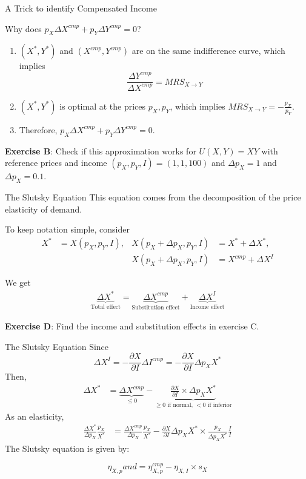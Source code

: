 \documentclass[handout]{beamer}
\newcommand{\cp}{{cmp}}
\begin{document}
\begin{frame}{A Trick to identify Compensated Income}

Why does $p_X\Delta X^{\cp} + p_Y \Delta Y^{\cp} = 0$?

\begin{enumerate}
\item $(X^*,Y^*)$ and $(X^\cp,Y^\cp)$ are on the same indifference curve, which implies $$\frac{\Delta Y^\cp}{\Delta X^\cp} = MRS_{X\to Y} $$
\item $(X^*,Y^*)$ is optimal at the prices $p_X, p_Y$, which implies $MRS_{X\to Y} = -\frac{p_X}{p_Y}$.
\item Therefore, $p_X \Delta X^\cp + p_Y \Delta Y^\cp = 0 $.
\end{enumerate}

\textbf{Exercise B}: Check if this approximation works for $U(X,Y) = XY$ with reference prices and income $(p_X,p_Y,I) = (1,1,100)$ and $\Delta p_X = 1$ and $\Delta p_X = 0.1$.
\end{frame}

\begin{frame}{The Slutsky Equation}
This equation comes from the decomposition of the price elasticity of demand.\medskip

To keep notation simple, consider 
\begin{align*}
 X^* &= X(p_X,p_Y,I), &     X(p_X + \Delta p_X, p_Y,I) &= X^* + \Delta X^*,\\ && X(p_X + \Delta p_X, p_Y,I) &= X^\cp +\Delta X^I
\end{align*}

We get
\begin{align*}
\underbrace{\Delta X^*}_{\text{Total effect}} = \underbrace{\Delta X^\cp}_{\text{Substitution effect}} + \underbrace{\Delta X^I}_{\text{Income effect}}
\end{align*}

\textbf{Exercise D}: Find the income and substitution effects in exercise C.
\end{frame}


\begin{frame}{The Slutsky Equation}
Since $$\Delta X^I =   -\frac{\partial X}{\partial I} \Delta I^\cp =  -\frac{\partial X}{\partial I}  \Delta p_X X^*$$
Then,
\begin{align*}
\Delta X^* &=   \underbrace{\Delta X^{\cp}}_{\leq 0} -   \underbrace{\frac{\partial X}{\partial I}\times \Delta p_X X^*}_{\geq 0 \text{ if normal, } <0 \text{ if inferior}} 
\end{align*}
As an elasticity, 
\begin{align*}
\frac{\Delta X^*}{\Delta p_X}\frac{p_X}{X^*} & = \frac{\Delta X^\cp}{\Delta p_X}\frac{p_X}{X^*} - \frac{\partial X}{\partial I} \Delta p_X X^*\times\frac{p_X}{\Delta p_X X^*}\frac{I}{I} 
\end{align*}
The Slutsky equation is given by: 

$$\eta_{X,p} and = \eta^\cp_{X,p}  - \eta_{X,I} \times s_X $$

\end{frame}
\end{document}
